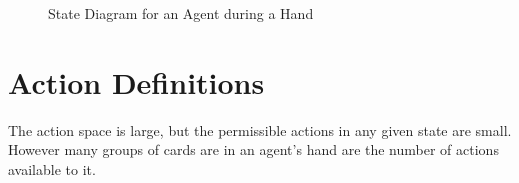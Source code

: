 \documentclass[10pt]{article} %
\begin{document}

\begin{figure}[h!]
\centering
{}
\caption{State Diagram for an Agent during a Hand}
\label{fig:states}
\end{figure}

\section{Action Definitions}

The action space is large, but the permissible actions in any given state are small. However many groups of cards are in an agent’s hand are the number of actions available to it.
\end{document}
